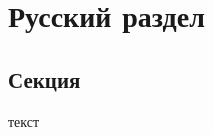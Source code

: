 \documentclass[utf8x, 14pt]{G7-32} %
\begin{document}
\tableofcontents

\chapter{Русский раздел}

\section{Секция}
текст
\end{document}
